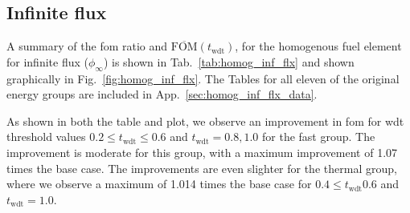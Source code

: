 \subsection{Infinite flux}
\label{sec:homog_inf_flx}

A summary of the \gls{fom} ratio and
$\overline{\mathrm{FOM}}(t_{\mathrm{wdt}})$, for the homogenous fuel
element for infinite flux ($\phi_{\infty}$) is shown in
Tab.~\ref{tab:homog_inf_flx} and shown graphically in
Fig.~\ref{fig:homog_inf_flx}. The Tables for all eleven of the
original energy groups are included in
App.~\ref{sec:homog_inf_flx_data}.

As shown in both the table and plot, we observe an improvement
in \gls{fom} for \gls{wdt} threshold values
$0.2 \leq t_{\mathrm{wdt}} \leq 0.6$ and $t_{\mathrm{wdt}} = 0.8, 1.0$ for
the fast group. The improvement is moderate for this
group, with a maximum improvement of 1.07 times the base case. The
improvements are even slighter for the thermal group, where we observe a
maximum of 1.014 times the base case for $0.4 \leq t_{\mathrm{wdt}} 0.6$ and $t_{\mathrm{wdt}} = 1.0$.

